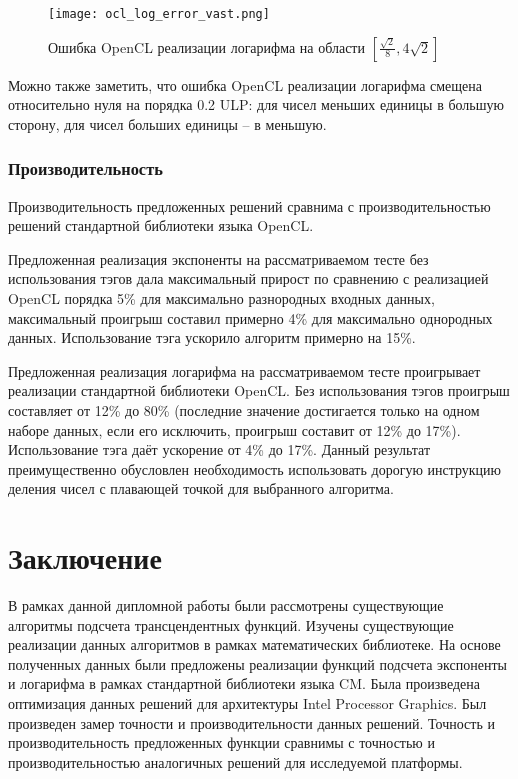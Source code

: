 \begin{figure}[hbt]
    \centering
    \texttt{[image: ocl\_log\_error\_vast.png]}
    \caption{Ошибка OpenCL реализации логарифма на области $[\frac{\sqrt{2}}{8}, 4\sqrt{2}]$}
    \label{plot:ocl_log:small}
\end{figure}

Можно также заметить, что ошибка OpenCL реализации логарифма смещена относительно нуля на порядка 0.2 ULP: для чисел меньших единицы в большую сторону, для чисел больших единицы -- в меньшую.

\subsection{Производительность}

Производительность предложенных решений сравнима с производительностью решений стандартной библиотеки языка OpenCL.

Предложенная реализация экспоненты на рассматриваемом тесте без использования тэгов дала максимальный прирост по сравнению с реализацией OpenCL порядка 5\% для максимально разнородных входных данных, максимальный проигрыш составил примерно 4\% для максимально однородных данных.
Использование тэга ускорило алгоритм примерно на 15\%.

Предложенная реализация логарифма на рассматриваемом тесте проигрывает реализации стандартной библиотеки OpenCL.
Без использования тэгов проигрыш составляет от 12\% до 80\% (последние значение достигается только на одном наборе данных, если его исключить, проигрыш составит от 12\% до 17\%).
Использование тэга даёт ускорение от 4\% до 17\%.
Данный результат преимущественно обусловлен необходимость использовать дорогую инструкцию деления чисел с плавающей точкой для выбранного алгоритма.

\chapter{Заключение}

В рамках данной дипломной работы были рассмотрены существующие алгоритмы подсчета трансцендентных функций.
Изучены существующие реализации данных алгоритмов в рамках математических библиотеке.
На основе полученных данных были предложены реализации функций подсчета экспоненты и логарифма в рамках стандартной библиотеки языка CM.
Была произведена оптимизация данных решений для архитектуры \foreignlanguage{english}{Intel Processor Graphics}.
Был произведен замер точности и производительности данных решений.
Точность и производительность предложенных функции сравнимы с точностью и производительностью аналогичных решений для исследуемой платформы.
